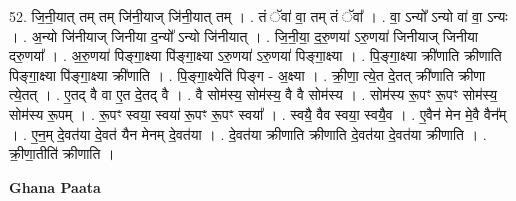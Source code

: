 \documentclass[17pt]{extarticle}
\begin{document}
52. जि॒नी॒यात् तम् तम् जि॑नी॒याज् जि॑नी॒यात् तम् । . तं ॅवा॑ वा॒ तम् तं ॅवा᳚ । . वा॒ ऽन्यो᳚ ऽन्यो वा॑ वा॒ ऽन्यः । . अ॒न्यो जि॑नीयाज् जिनीया द॒न्यो᳚ ऽन्यो जि॑नीयात् । . जि॒नी॒या॒ द॒रु॒णया॑ ऽरु॒णया॑ जिनीयाज् जिनीया दरु॒णया᳚ । . अ॒रु॒णया॑ पिङ्गा॒क्ष्या पि॑ङ्गा॒क्ष्या ऽरु॒णया॑ ऽरु॒णया॑ पिङ्गा॒क्ष्या । . पि॒ङ्गा॒क्ष्या क्री॑णाति क्रीणाति पिङ्गा॒क्ष्या पि॑ङ्गा॒क्ष्या क्री॑णाति । . पि॒ङ्गा॒क्ष्येति॑ पिङ्ग - अ॒क्ष्या । . क्री॒णा॒ त्ये॒त दे॒तत् क्री॑णाति क्रीणा त्ये॒तत् । . ए॒तद् वै वा ए॒त दे॒तद् वै । . वै सोम॑स्य॒ सोम॑स्य॒ वै वै सोम॑स्य । . सोम॑स्य रू॒पꣳ रू॒पꣳ सोम॑स्य॒ सोम॑स्य रू॒पम् । . रू॒पꣳ स्वया॒ स्वया॑ रू॒पꣳ रू॒पꣳ स्वया᳚ । . स्वयै॒ वैव स्वया॒ स्वयै॒व । . ए॒वैन॑ मेन मे॒वै वैन᳚म् । . ए॒न॒म् दे॒वत॑या दे॒वत॑ यैन मेनम् दे॒वत॑या । . दे॒वत॑या क्रीणाति क्रीणाति दे॒वत॑या दे॒वत॑या क्रीणाति । . क्री॒णा॒तीति॑ क्रीणाति । \newline

\textbf{Ghana Paata } \newline
\end{document}
